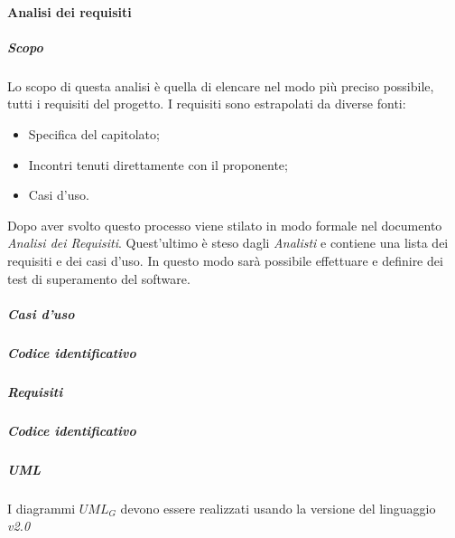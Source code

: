 		\paragraph{Analisi dei requisiti}
			\subparagraph{Scopo} \Spazio
			Lo scopo di questa analisi è quella di elencare nel modo più preciso possibile, tutti i requisiti del progetto. 
			I requisiti sono estrapolati da diverse fonti:
				\begin{itemize}
				\item Specifica del capitolato;
				\item Incontri tenuti direttamente con il proponente;
				\item Casi d'uso.
			\end{itemize}
		    Dopo aver svolto questo processo viene stilato in modo formale nel documento \textit{Analisi dei Requisiti}.
		    Quest'ultimo è steso dagli \emph{Analisti} e contiene una lista dei requisiti e dei casi d'uso.
		    In questo modo sarà possibile effettuare e definire dei test di superamento del software. 

			\subparagraph{Casi d'uso}
			\subparagraph{Codice identificativo}
			\subparagraph{Requisiti}
			\subparagraph{Codice identificativo}
			\subparagraph{UML}
			I diagrammi $UML_G$ devono essere realizzati usando la versione del linguaggio \textit{v2.0}
			
			
